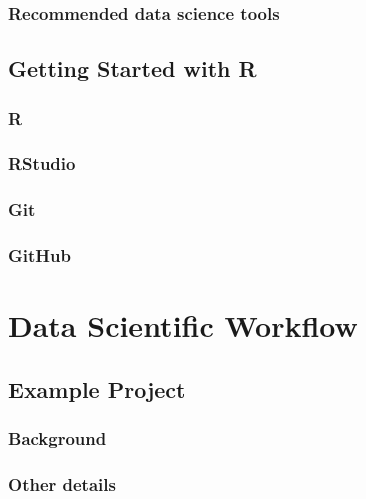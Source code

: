 \documentclass[
]{book}
\begin{document}
\hypertarget{recommended-data-science-tools}{%
\section{Recommended data science tools}\label{recommended-data-science-tools}}

\hypertarget{start_R}{%
\chapter{Getting Started with R}\label{start_R}}

\hypertarget{r}{%
\section{R}\label{r}}

\hypertarget{rstudio}{%
\section{RStudio}\label{rstudio}}

\hypertarget{git}{%
\section{Git}\label{git}}

\hypertarget{github}{%
\section{GitHub}\label{github}}

\hypertarget{part-data-scientific-workflow}{%
\part*{Data Scientific Workflow}\label{part-data-scientific-workflow}}

\hypertarget{ex_proj}{%
\chapter{Example Project}\label{ex_proj}}

\hypertarget{background}{%
\section{Background}\label{background}}

\hypertarget{other-details}{%
\section{Other details}\label{other-details}}
\end{document}
